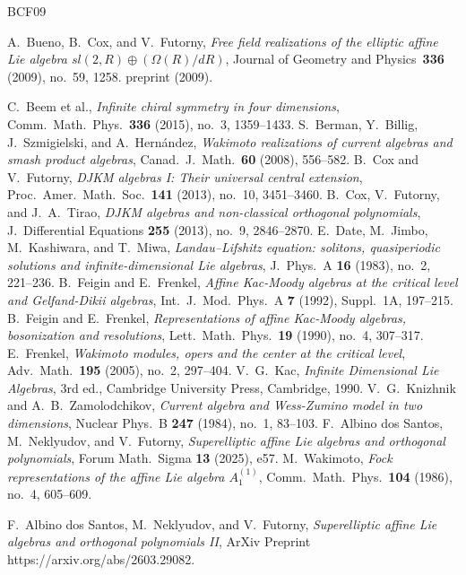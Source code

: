 \documentclass[12pt]{article}
\theoremstyle{plain}
\theoremstyle{definition}
\theoremstyle{remark}
\begin{document}
\begin{thebibliography}{BCF09}

A.~Bueno, B.~Cox, and V.~Futorny,
\textit{Free field realizations of the elliptic affine Lie algebra $sl(2, R) \oplus (\Omega(R)/dR)$},
Journal of Geometry and Physics\ \textbf{336} (2009), no.~59, 1258.
preprint (2009).

C.~Beem et al.,
\textit{Infinite chiral symmetry in four dimensions},
Comm.\ Math.\ Phys.\ \textbf{336} (2015), no.~3, 1359--1433.
S.~Berman, Y.~Billig, J.~Szmigielski, and A.~Hern\'{a}ndez,
\textit{Wakimoto realizations of current algebras and smash product algebras},
Canad.\ J.\ Math.\ \textbf{60} (2008), 556--582.
B.~Cox and V.~Futorny,
\textit{DJKM algebras I: Their universal central extension},
Proc.\ Amer.\ Math.\ Soc.\ \textbf{141} (2013), no.~10, 3451--3460.
B.~Cox, V.~Futorny, and J.~A.~Tirao,
\textit{DJKM algebras and non-classical orthogonal polynomials},
J.\ Differential Equations \textbf{255} (2013), no.~9, 2846--2870.
E.~Date, M.~Jimbo, M.~Kashiwara, and T.~Miwa,
\textit{Landau--Lifshitz equation: solitons, quasiperiodic solutions and
infinite-dimensional Lie algebras},
J.\ Phys.\ A \textbf{16} (1983), no.~2, 221--236.
B.~Feigin and E.~Frenkel,
\textit{Affine Kac-Moody algebras at the critical level and
Gelfand-Dikii algebras},
Int.\ J.\ Mod.\ Phys.\ A \textbf{7} (1992), Suppl.~1A, 197--215.
B.~Feigin and E.~Frenkel,
\textit{Representations of affine Kac-Moody algebras, bosonization and
resolutions},
Lett.\ Math.\ Phys.\ \textbf{19} (1990), no.~4, 307--317.
E.~Frenkel,
\textit{Wakimoto modules, opers and the center at the critical level},
Adv.\ Math.\ \textbf{195} (2005), no.~2, 297--404.
V.~G.~Kac,
\textit{Infinite Dimensional Lie Algebras},
3rd ed., Cambridge University Press, Cambridge, 1990.
V.~G.~Knizhnik and A.~B.~Zamolodchikov,
\textit{Current algebra and Wess-Zumino model in two dimensions},
Nuclear Phys.\ B \textbf{247} (1984), no.~1, 83--103.
F.~Albino dos Santos, M.~Neklyudov, and V.~Futorny,
\textit{Superelliptic affine Lie algebras and orthogonal polynomials},
Forum Math.\ Sigma \textbf{13} (2025), e57.
M.~Wakimoto,
\textit{Fock representations of the affine Lie algebra $A_1^{(1)}$},
Comm.\ Math.\ Phys.\ \textbf{104} (1986), no.~4, 605--609.

F.~Albino dos Santos, M.~Neklyudov, and V.~Futorny,
\textit{Superelliptic affine Lie algebras and orthogonal polynomials II},
ArXiv Preprint https://arxiv.org/abs/2603.29082.


\end{thebibliography}
\end{document}
